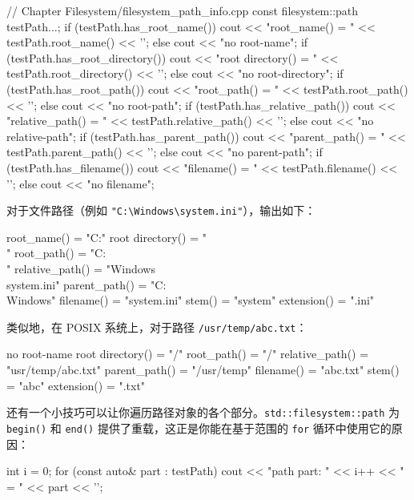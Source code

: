\begin{codebox}[cpp]
// Chapter Filesystem/filesystem_path_info.cpp
const filesystem::path testPath{...};
if (testPath.has_root_name())
    cout << "root_name() = " << testPath.root_name() << '\n';
else
    cout << "no root-name\n";
if (testPath.has_root_directory())
    cout << "root directory() = " << testPath.root_directory() << '\n';
else
    cout << "no root-directory\n";
if (testPath.has_root_path())
    cout << "root_path() = " << testPath.root_path() << '\n';
else
    cout << "no root-path\n";
if (testPath.has_relative_path())
    cout << "relative_path() = " << testPath.relative_path() << '\n';
else
    cout << "no relative-path\n";
if (testPath.has_parent_path())
    cout << "parent_path() = " << testPath.parent_path() << '\n';
else
    cout << "no parent-path\n";
if (testPath.has_filename())
    cout << "filename() = " << testPath.filename() << '\n';
else
    cout << "no filename\n";
\end{codebox}

对于文件路径（例如 \texttt{"C:\textbackslash Windows\textbackslash system.ini"}），输出如下：

\begin{codebox}[cpp]
root_name() = "C:"
root directory() = "\\"
root_path() = "C:\\"
relative_path() = "Windows\\system.ini"
parent_path() = "C:\\Windows"
filename() = "system.ini"
stem() = "system"
extension() = ".ini"
\end{codebox}

类似地，在 POSIX 系统上，对于路径 \texttt{/usr/temp/abc.txt}：

\begin{codebox}[cpp]
no root-name
root directory() = "/"
root_path() = "/"
relative_path() = "usr/temp/abc.txt"
parent_path() = "/usr/temp"
filename() = "abc.txt"
stem() = "abc"
extension() = ".txt"
\end{codebox}

还有一个小技巧可以让你遍历路径对象的各个部分。\texttt{std::filesystem::path} 为 \texttt{begin()} 和 \texttt{end()} 提供了重载，这正是你能在基于范围的 \texttt{for} 循环中使用它的原因：

\begin{codebox}[cpp]
int i = 0;
for (const auto& part : testPath)
    cout << "path part: " << i++ << " = " << part << '\n';
\end{codebox}

